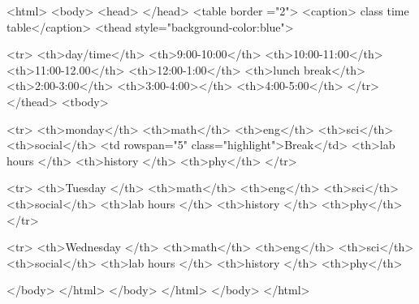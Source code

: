 <html>
<body>
<head>
</head>
<table border ="2">
<caption> class time table</caption>
<thead style="background-color:blue">

<tr>
<th>day/time</th>
<th>9:00-10:00</th>
<th>10:00-11:00</th>
<th>11:00-12.00</th>
<th>12:00-1:00</th>
<th>lunch break</th>
<th>2:00-3:00</th>
<th>3:00-4:00></th>
<th>4:00-5:00</th>
</tr>
</thead>
<tbody>

<tr>
<th>monday</th>
<th>math</th>
<th>eng</th>
<th>sci</th>
<th>social</th>
<td rowspan="5" class="highlight">Break</td>
<th>lab hours </th>
<th>history </th>
<th>phy</th>
</tr>

<tr>
<th>Tuesday </th>
<th>math</th>
<th>eng</th>
<th>sci</th>
<th>social</th>
<th>lab hours </th>
<th>history </th>
<th>phy</th>
</tr>

<tr>
<th>Wednesday </th>
<th>math</th>
<th>eng</th>
<th>sci</th>
<th>social</th>
<th>lab hours </th>
<th>history </th>
<th>phy</th>


</body>
</html>
</body>
</html>
</body>
</html>
